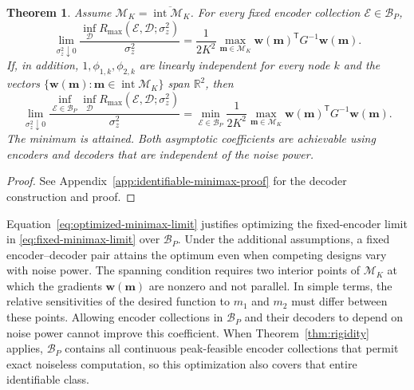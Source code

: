 \documentclass[journal,12pt,onecolumn,draftclsnofoot]{IEEEtran}
\newtheorem{theorem}{Theorem}
\newcommand{\enc}{\mathscr{E}}\newcommand{\dec}{\mathscr{D}}\newcommand{\R}{\mathbb R}\newcommand{\C}{\mathbb C}
\newcommand{\T}{\mathsf T}\newcommand{\suc}{\succeq}
\begin{document}
\begin{theorem}\label{thm:identifiable-minimax}
Assume $\mathcal M_K=\overline{\operatorname{int}\mathcal M_K}$.
For every fixed encoder collection $\enc\in\mathcal B_P$,
\begin{equation}
 \lim_{\sigma_z^2\downarrow0}
 \frac{\inf_{\dec} R_{\max}(\enc,\dec;\sigma_z^2)}{\sigma_z^2}
 =\frac{1}{2K^2}\max_{\boldsymbol m\in\mathcal M_K}
 \boldsymbol w(\boldsymbol m)^\T G^{-1}\boldsymbol w(\boldsymbol m).
 \label{eq:fixed-minimax-limit}
\end{equation}
If, in addition, $1,\phi_{1,k},\phi_{2,k}$ are linearly independent
for every node $k$ and the vectors
$\{\boldsymbol w(\boldsymbol m):\boldsymbol m\in
\operatorname{int}\mathcal M_K\}$ span $\R^2$, then
\begin{equation}
 \lim_{\sigma_z^2\downarrow0}
 \frac{\inf_{\enc\in\mathcal B_P}\inf_{\dec}
 R_{\max}(\enc,\dec;\sigma_z^2)}{\sigma_z^2}=
 \min_{\enc\in\mathcal B_P}\frac{1}{2K^2}
 \max_{\boldsymbol m\in\mathcal M_K}
 \boldsymbol w(\boldsymbol m)^\T G^{-1}\boldsymbol w(\boldsymbol m).
 \label{eq:optimized-minimax-limit}
\end{equation}
The minimum is attained. Both asymptotic coefficients are achievable using encoders and decoders that are independent of the noise power.
\end{theorem}
\begin{proof}
See Appendix~\ref{app:identifiable-minimax-proof} for the decoder
construction and proof.
\end{proof}



Equation~\eqref{eq:optimized-minimax-limit} justifies optimizing the fixed-encoder limit in \eqref{eq:fixed-minimax-limit} over $\mathcal B_P$. Under the additional assumptions, a fixed encoder--decoder pair attains the optimum even when competing designs vary with noise power. The spanning condition requires two interior points of $\mathcal M_K$ at which the gradients $\boldsymbol w(\boldsymbol m)$ are nonzero and not parallel. In simple terms, the relative sensitivities of the desired function to $m_1$ and $m_2$ must differ between these points. Allowing encoder collections in $\mathcal B_P$ and their decoders to depend on noise power cannot improve this coefficient. When Theorem~\ref{thm:rigidity} applies, $\mathcal B_P$ contains all continuous peak-feasible encoder collections that permit exact noiseless computation, so this optimization also covers that entire identifiable class.
\end{document}
